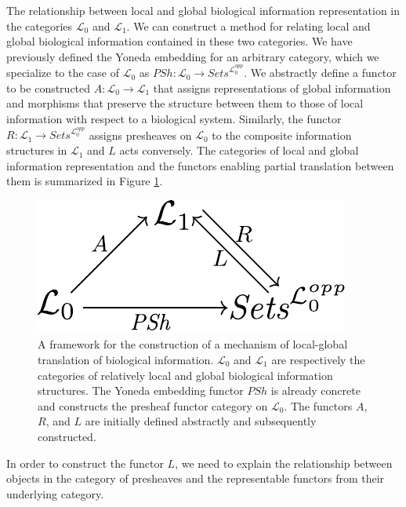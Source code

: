 \documentclass[aps,twocolumn]{revtex4-1}
\begin{document}

The relationship between local and global biological information representation in the categories $\mathcal{L}_0$ and $\mathcal{L}_1$. We can construct a method for relating local and global biological information contained in these two categories. We have previously defined the Yoneda embedding for an arbitrary category, which we specialize to the case of $\mathcal{L}_0$ as $PSh: \mathcal{L}_0 \rightarrow \textit{Sets}^{\mathcal{L}_0^{opp}}$. We abstractly define a functor to be constructed $A:\mathcal{L}_0 \rightarrow \mathcal{L}_1$ that assigns representations of global information and morphisms that preserve the structure between them to those of local information with respect to a biological system.  Similarly, the functor $R: \mathcal{L}_1 \rightarrow \textit{Sets}^{\mathcal{L}_0^{opp}}$ assigns presheaves on $\mathcal{L}_0$ to the composite information structures in $\mathcal{L}_1$ and $L$ acts conversely. The categories of local and global information representation and the functors enabling partial translation between them is summarized in Figure \ref{fig:ascent}.

\begin{figure}
\noindent\includegraphics[width=0.5\columnwidth]{fig/ascent.pdf}
\caption{A framework for the construction of a mechanism of local-global translation of biological information. $\mathcal{L}_0$ and $\mathcal{L}_1$ are respectively the categories of relatively local and global biological information structures. The Yoneda embedding functor $PSh$ is already concrete and constructs the presheaf functor category on $\mathcal{L}_0$. The functors $A$, $R$, and $L$ are initially defined abstractly and subsequently constructed.}
\label{fig:ascent}
\end{figure}

In order to construct the functor $L$, we need to explain the relationship between objects in the category of presheaves and the representable functors from their underlying category.
\end{document}
